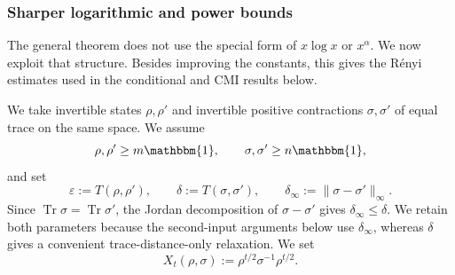\documentclass[11pt]{article}
\theoremstyle{remark}
\newcommand{\1}{\mathbbm{1}}
\begin{document}
\subsubsection{Sharper logarithmic and power bounds}
\label{subsec:joint-continuity-log-power}

The general theorem does not use the special form of $x\log x$ or
$x^\alpha$.  We now exploit that structure.  Besides improving the
constants, this gives the R\'enyi estimates used in the conditional
and CMI results below.

We take invertible states $\rho,\rho'$ and invertible positive
contractions $\sigma,\sigma'$ of equal trace on the same space.  We assume
\begin{equation}
 \rho,\rho'\geq m\1,
 \qquad
 \sigma,\sigma'\geq n\1,
 \label{eq:joint-slab-assumptions}
\end{equation}
and set
\begin{equation}
 \varepsilon:=T(\rho,\rho'),
 \qquad
 \delta:=T(\sigma,\sigma'),
 \qquad
 \delta_\infty:=\lVert\sigma-\sigma'\rVert_\infty.
 \label{eq:joint-slab-perturbations}
\end{equation}
Since $\operatorname{Tr}\sigma=\operatorname{Tr}\sigma'$, the
Jordan decomposition of $\sigma-\sigma'$ gives
$\delta_\infty\leq\delta$.  We retain both parameters because the
second-input arguments below use $\delta_\infty$, whereas
$\delta$ gives a convenient trace-distance-only relaxation.  We set
\begin{equation}
 X_t(\rho,\sigma):=\rho^{t/2}\sigma^{-1}\rho^{t/2}.
 \label{eq:joint-slab-X}
\end{equation}
\end{document}
